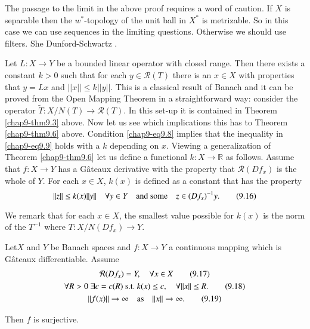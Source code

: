 \setcounter{remark}{0}
\begin{remark}\label{chap9-addrem1}
The passage to the limit in the above proof requires a word of
caution. If $X$ is separable then the $w^{*}$-topology of the unit
ball in $X^{*}$ is metrizable. So in this case we can use sequences in
the limiting questions. Otherwise we should use filters. She
Dunford-Schwartz \cite[p. 426]{key35}.
\end{remark}

\begin{remark}\label{chap9-addrem2}
Let $L:X\to Y$ be a bounded linear operator with closed range. Then
there exists a constant $k>0$ such that for each $y\in \mathcal{R}(T)$
there is an $x\in X$ with properties that $y=Lx$ and $||x||\leq
k||y||$. This is a classical result of Banach and it can be proved
from the Open Mapping Theorem in a straightforward way: consider the
operator $\widetilde{T}:X/N(T)\to \mathcal{R}(T)$. In this set-up it
is contained in Theorem \ref{chap9-thm9.3} above. Now let us see which
implications this has to Theorem \ref{chap9-thm9.6} above. Condition
\eqref{chap9-eq9.8} implies that the inequality in \eqref{chap9-eq9.9}
holds with a $k$ depending on $x$. Viewing a generalization of Theorem
\ref{chap9-thm9.6} let us define a functional $k:X\to \mathbb{R}$ as
follows. Assume that $f:X\to Y$ has a G\^ateaux derivative with the
property that $\mathcal{R}(Df_{x})$ is the whole of $Y$. For each
$x\in X$, $k(x)$ is defined as a constant that has the property
\begin{equation*}
||z||\leq k(x)||y||\quad\forall y\in Y\quad\text{and some}\quad z\in
(Df_{x})^{-1}y.\tag{9.16}\label{chap9-eq9.16} 
\end{equation*}

We remark that for each $x\in X$, the smallest value possible for
$k(x)$ is the norm of the $T^{-1}$ where $T:X/N(Df_{x})\to Y$. 
\end{remark}

\begin{theorem}\label{chap9-thm9.7}
Let\pageoriginale $X$ and $Y$ be Banach spaces and $f:X\to Y$ a
continuous mapping 
which is G\^ateaux differentiable. Assume
\begin{gather*}
\mathcal{R}(Df_{x})=Y,\quad \forall x\in
X\tag{9.17}\label{chap9-eq9.17}\\
\forall R>0\ \exists c=c(R)\text{~s.t.~}k(x)\leq c,\quad \forall
||x||\leq R.\tag{9.18}\label{chap9-eq9.18}\\
||f(x)||\to \infty\quad\text{as}\quad ||x||\to
\infty.\tag{9.19}\label{chap9-eq9.19} 
\end{gather*}

Then $f$ is surjective.
\end{theorem}

